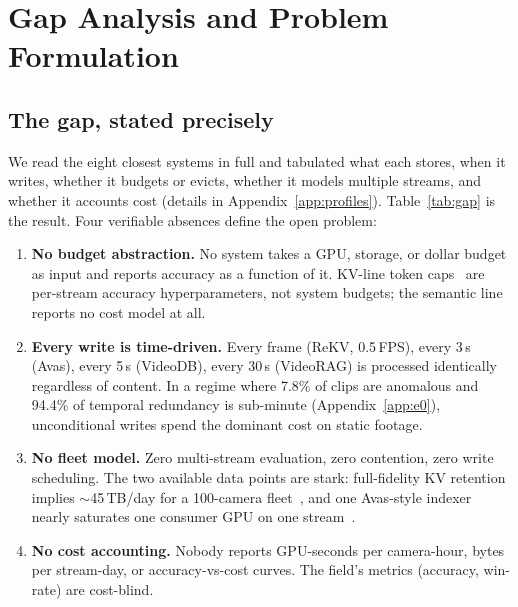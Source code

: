 \section{Gap Analysis and Problem Formulation}
\label{sec:gap}

\subsection{The gap, stated precisely}
\label{sec:gap-matrix}

We read the eight closest systems in full and tabulated what each stores, when it writes, whether it budgets or evicts, whether it models multiple streams, and whether it accounts cost (details in Appendix~\ref{app:profiles}). Table~\ref{tab:gap} is the result. Four verifiable absences define the open problem:

\begin{enumerate}
\item \textbf{No budget abstraction.} No system takes a GPU, storage, or dollar budget as input and reports accuracy as a function of it. KV-line token caps~\cite{livevlm,streammem,streamingvlm} are per-stream accuracy hyperparameters, not system budgets; the semantic line~\cite{avas,videoraghkuds,worldmm,videodb} reports no cost model at all.
\item \textbf{Every write is time-driven.} Every frame (ReKV, 0.5\,FPS), every 3\,s (Avas), every 5\,s (VideoDB), every 30\,s (VideoRAG) is processed identically regardless of content. In a regime where 7.8\% of clips are anomalous and 94.4\% of temporal redundancy is sub-minute (Appendix~\ref{app:e0}), unconditional writes spend the dominant cost on static footage.
\item \textbf{No fleet model.} Zero multi-stream evaluation, zero contention, zero write scheduling. The two available data points are stark: full-fidelity KV retention implies $\sim$45\,TB/day for a 100-camera fleet~\cite{rekv}, and one Avas-style indexer nearly saturates one consumer GPU on one stream~\cite{avas}.
\item \textbf{No cost accounting.} Nobody reports GPU-seconds per camera-hour, bytes per stream-day, or accuracy-vs-cost curves. The field's metrics (accuracy, win-rate) are cost-blind.
\end{enumerate}

